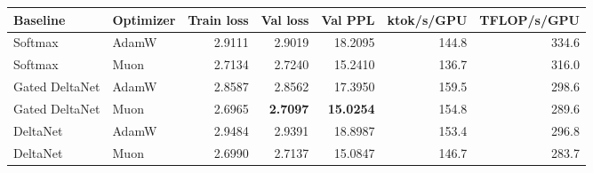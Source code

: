 \begin{tabular}{llrrrrr}
\toprule
Baseline & Optimizer & Train loss & Val loss & Val PPL & ktok/s/GPU & TFLOP/s/GPU \\
\midrule
Softmax & AdamW & 2.9111 & 2.9019 & 18.2095 & 144.8 & 334.6 \\
Softmax & Muon & 2.7134 & 2.7240 & 15.2410 & 136.7 & 316.0 \\
Gated DeltaNet & AdamW & 2.8587 & 2.8562 & 17.3950 & 159.5 & 298.6 \\
Gated DeltaNet & Muon & 2.6965 & \textbf{2.7097} & \textbf{15.0254} & 154.8 & 289.6 \\
DeltaNet & AdamW & 2.9484 & 2.9391 & 18.8987 & 153.4 & 296.8 \\
DeltaNet & Muon & 2.6990 & 2.7137 & 15.0847 & 146.7 & 283.7 \\
\bottomrule
\end{tabular}
